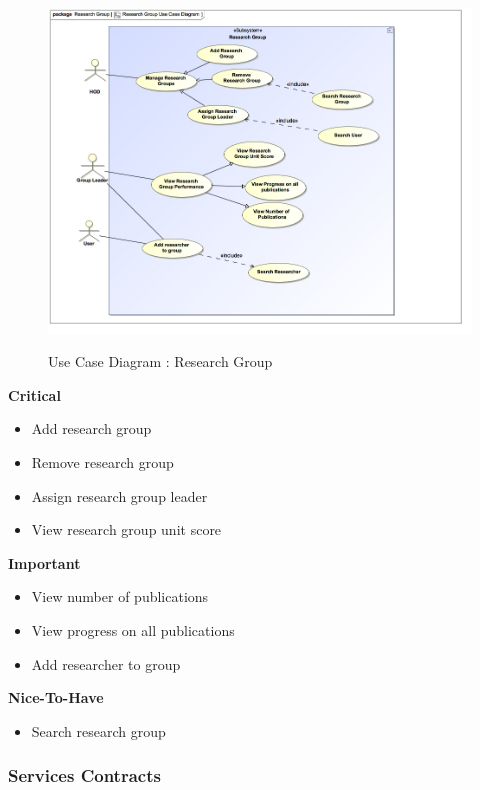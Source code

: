 \documentclass{article}
\begin{document}
		\begin{figure}[H]
			\includegraphics[width=\textwidth]{Vuyani_Diagrams/ResearchGroupUseCaseDiagram.jpg}  \\
			\caption{Use Case Diagram : Research Group}
		\end{figure}
		\begin{flushleft}
			\textbf{Critical}
				\begin{itemize}
	  				\item Add research group
	  				\item Remove research group
					\item Assign research group leader
					\item View research group unit score
				\end{itemize}

			\textbf{Important}
				\begin{itemize}
	  				\item View number of publications
	  				\item View progress on all publications
					\item Add researcher to group
				\end{itemize}

			\textbf{Nice-To-Have}
				\begin{itemize}
	  				\item Search research group
				\end{itemize}
		\end{flushleft}

	\subsubsection{Services Contracts}
\end{document}
